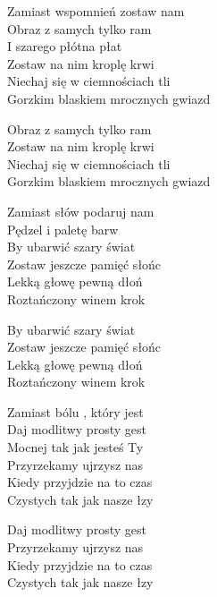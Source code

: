 \begin{text}
    Zamiast wspomnień zostaw nam\\
    Obraz z samych tylko ram\\
    I szarego płótna płat\\
    Zostaw na nim kroplę krwi\\
    Niechaj się w ciemnościach tli\\
    Gorzkim blaskiem mrocznych gwiazd

    Obraz z samych tylko ram\\
    Zostaw na nim kroplę krwi\\
    Niechaj się w ciemnościach tli\\
    Gorzkim blaskiem mrocznych gwiazd

    Zamiast słów podaruj nam\\
    Pędzel i paletę barw\\
    By ubarwić szary świat\\
    Zostaw jeszcze pamięć słońc\\
    Lekką głowę pewną dłoń\\
    Roztańczony winem krok

    By ubarwić szary świat\\
    Zostaw jeszcze pamięć słońc\\
    Lekką głowę pewną dłoń\\
    Roztańczony winem krok

    Zamiast bólu , który jest\\
    Daj modlitwy prosty gest\\
    Mocnej tak jak jesteś Ty\\
    Przyrzekamy ujrzysz nas\\
    Kiedy przyjdzie na to czas\\
    Czystych tak jak nasze łzy

    Daj modlitwy prosty gest\\
    Przyrzekamy ujrzysz nas\\
    Kiedy przyjdzie na to czas\\
    Czystych tak jak nasze łzy
\end{text}
\begin{chord}

\end{chord}